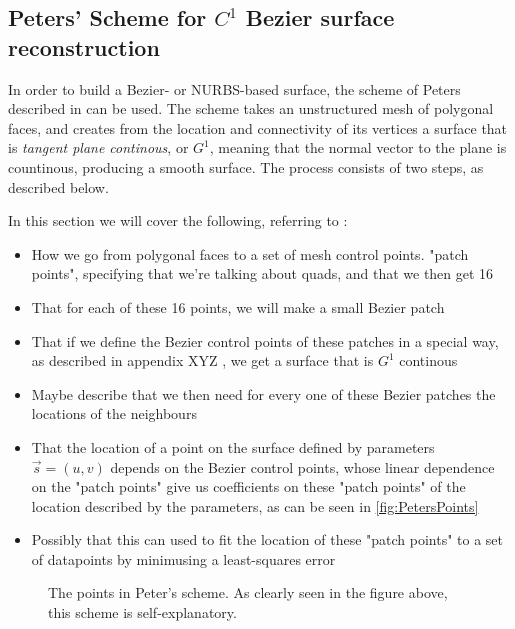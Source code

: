 \subsection{Peters' Scheme for $C^1$ Bezier surface reconstruction}
In order to build a Bezier- or NURBS-based surface, the scheme of Peters described in \cite{peters1992constructing} can be used. The scheme takes an unstructured mesh of polygonal faces, and creates from the location and connectivity of its vertices a surface that is \emph{tangent plane continous}, or $G^1$, meaning that the normal vector to the plane is countinous, producing a smooth surface. The process consists of two steps, as described below.


In this section we will cover the following, referring to \cite{peters1992constructing}:
\begin{itemize}
\item How we go from polygonal faces to a set of mesh control points. "patch points", specifying that we're talking about quads, and that we then get 16
\item That for each of these 16 points, we will make a small Bezier patch
\item That if we define the Bezier control points of these patches in a special way, as described in appendix XYZ , we get a surface that is $G^1$ continous
\item Maybe describe that we then need for every one of these Bezier patches the locations of the neighbours
\item That the location of a point on the surface defined by parameters $\vec{s} = (u,v)$ depends on the Bezier control points, whose linear dependence on the "patch points" give us coefficients on these "patch points" of the location described by the parameters, as can be seen in \autoref{fig:PetersPoints}
\item Possibly that this can used to fit the location of these "patch points" to a set of datapoints by minimusing a least-squares error 
\end{itemize}
\begin{figure}

\label{fig:PetersPoints}
\caption{The points in Peter's scheme. As clearly seen in the figure above, this scheme is self-explanatory.}
\end{figure}
